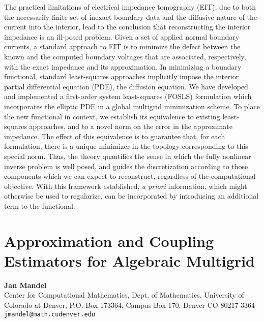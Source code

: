 \documentclass[11pt]{article}
\newcommand{\nextab}[4]{
	\section{#2}
	{\bf #1} \\ \nopagebreak
	{#3} \\ \nopagebreak
	{\tt #4} \nopagebreak
	}
\begin{document}
The practical limitations of electrical impedance tomography
(EIT), due to both the necessarily finite set of inexact boundary
data and the diffusive nature of the current into the interior,
lead to the conclusion that reconstructing the interior impedance
is an ill-posed problem. Given a set of applied normal boundary
currents, a standard approach to EIT is to minimize the defect
between the known and the computed boundary voltages that are
associated, respectively, with the exact impedance and its
approximation. In minimizing a boundary functional, standard
least-squares approaches implicitly impose the interior partial
differential equation (PDE), the diffusion equation. We have
developed and implemented a first-order system least-squares
(FOSLS) formulation which incorporates the elliptic PDE in a
global multigrid minimization scheme. To place the new functional in
context, we establish its equivalence to existing least-squares
approaches, and to a novel norm on the error in the approximate
impedance. The effect of this equivalence is to guarantee that,
for each formulation, there is a unique minimizer in the topology
corresponding to this special norm.  Thus, the theory quantifies
the sense in which the fully nonlinear inverse problem is well
posed, and guides the discretization according to those components
which we can expect to reconstruct, regardless of the
computational objective. With this framework established, {\it a
priori} information, which might otherwise be used to regularize,
can be incorporated by introducing an additional term to the
functional.







\nextab
{Jan Mandel}
{Approximation and Coupling Estimators for Algebraic Multigrid}
{Center for Computational Mathematics, Dept. of Mathematics, University of Colorado at Denver, P.O. Box 173364, Campus Box 170, Denver CO 80217-3364}
{jmandel@math.cudenver.edu}
\end{document}
